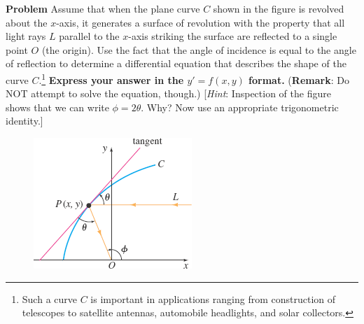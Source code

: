 \documentclass[12pt]{article}
\title{}
\date{}
\begin{document}
\noindent
{\bf Problem}
Assume that when the plane curve $C$ shown in the figure is revolved about the $x$-axis, it generates a surface of revolution with the property that all light rays $L$ parallel to the $x$-axis striking the surface are reflected to a single point $O$ (the origin). Use the fact that the angle of incidence is equal to the angle of reflection to determine a differential equation that describes the shape of the curve $C$.\footnote{Such a curve $C$ is important in applications ranging from construction of telescopes to satellite antennas, automobile headlights, and solar collectors.} {\bf Express your answer in the $y' = f(x,y)$ format.} ({\bf Remark}: Do NOT attempt to solve the equation, though.) [{\it Hint}: Inspection of the figure shows that we can write $\phi = 2\theta$. Why? Now use  an appropriate trigonometric identity.]
\begin{figure}[h]
\includegraphics[width=.382\textwidth, right]{lightfocus.png}
\end{figure}
\end{document}
